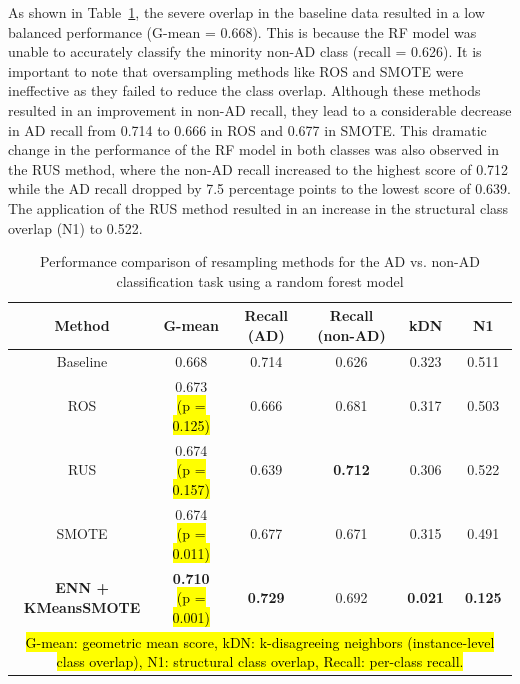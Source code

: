 As shown in Table~\ref{table:ad_nonad_resampling}, the severe overlap in the baseline data resulted in a low balanced performance (G-mean = 0.668). This is because the RF model was unable to accurately classify the minority non-AD class (recall = 0.626). It is important to note that oversampling methods like ROS and SMOTE were ineffective as they failed to reduce the class overlap. Although these methods resulted in an improvement in non-AD recall, they lead to a considerable decrease in AD recall from 0.714 to 0.666 in ROS and 0.677 in SMOTE. This dramatic change in the performance of the RF model in both classes was also observed in the RUS method, where the non-AD recall increased to the highest score of  0.712 while the AD recall dropped by 7.5 percentage points to the lowest score of 0.639. The application of the RUS method resulted in an increase in the structural class overlap (N1) to 0.522. 

\begin{table}[!ht]
    \centering
    \caption{Performance comparison of resampling methods for the AD vs. non-AD classification task using a random forest model}
    \begin{tabular}{|c|c|c|c|c|c|}
    \hline
        Method & G-mean & Recall (AD) & Recall (non-AD) & kDN & N1 \\ \hline
        Baseline & 0.668 & 0.714 & 0.626 & 0.323 & 0.511 \\ \hline
        ROS & \makecell{0.673 \\ {\small \hl{(p = 0.125)}}} & 0.666 & 0.681 & 0.317 & 0.503 \\ \hline
        RUS & \makecell{0.674 \\ {\small \hl{(p = 0.157)}}} & 0.639 & \textbf{0.712} & 0.306 & 0.522 \\ \hline
        SMOTE & \makecell{0.674 \\ {\small \hl{(p = 0.011)}}} & 0.677 & 0.671 & 0.315 & 0.491 \\ \hline
        \makecell{\textbf{ENN +} \\ \textbf{KMeansSMOTE}} & \makecell{\textbf{0.710} \\ {\small \hl{(p = 0.001)}}} & \textbf{0.729} & 0.692 & \textbf{0.021} & \textbf{0.125} \\ \hline
        \multicolumn{6}{p{400pt}}{\footnotesize \hl{G-mean: geometric mean score, kDN: k-disagreeing neighbors (instance-level class overlap), N1: structural class overlap, Recall: per-class recall.}}
    \end{tabular}
    \label{table:ad_nonad_resampling}
\end{table}

